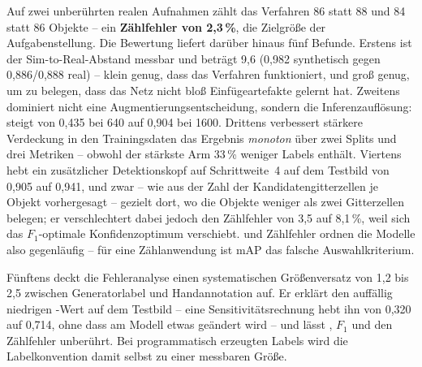 Auf zwei unberührten realen Aufnahmen zählt das Verfahren 86 statt 88 und 84
statt 86 Objekte -- ein \textbf{Zählfehler von 2,3\,\%}, die Zielgröße der
Aufgabenstellung. Die Bewertung liefert darüber hinaus fünf Befunde. Erstens ist
der Sim-to-Real-Abstand messbar und beträgt 9,6\PP{} \mAPfifty{}
(0,982 synthetisch gegen 0,886/0,888 real) -- klein genug, dass das Verfahren
funktioniert, und groß genug, um zu belegen, dass das Netz nicht bloß
Einfügeartefakte gelernt hat. Zweitens dominiert nicht eine
Augmentierungsentscheidung, sondern die Inferenzauflösung: \mAPfifty{} steigt von
0,435 bei 640\px{} auf 0,904 bei 1600\px. Drittens verbessert stärkere
Verdeckung in den Trainingsdaten das Ergebnis \emph{monoton} über zwei Splits und
drei Metriken -- obwohl der stärkste Arm 33\,\% weniger Labels enthält.
Viertens hebt ein zusätzlicher Detektionskopf auf Schrittweite~4 \mAPfifty{} auf
dem Testbild von 0,905 auf 0,941, und zwar -- wie aus der Zahl der
Kandidatengitterzellen je Objekt vorhergesagt -- gezielt dort, wo die Objekte
weniger als zwei Gitterzellen belegen; er verschlechtert dabei jedoch den
Zählfehler von 3,5 auf 8,1\,\%, weil sich das $F_1$-optimale
Konfidenzoptimum verschiebt. \mAPfifty{} und Zählfehler ordnen die Modelle also
gegenläufig -- für eine Zählanwendung ist mAP das falsche Auswahlkriterium.

Fünftens deckt die Fehleranalyse einen systematischen Größenversatz von 1,2 bis
2,5\px{} zwischen Generatorlabel und Handannotation auf. Er erklärt den auffällig
niedrigen \mAPseven{}-Wert auf dem Testbild -- eine Sensitivitätsrechnung hebt
ihn von 0,320 auf 0,714, ohne dass am Modell etwas geändert wird -- und lässt
\mAPfifty{}, $F_1$ und den Zählfehler unberührt. Bei programmatisch erzeugten
Labels wird die Labelkonvention damit selbst zu einer messbaren Größe.
